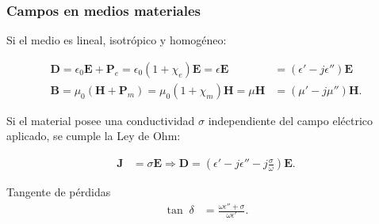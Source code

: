 \documentclass{beamer}
\renewcommand{\vec}[1]{\boldsymbol{#1}}
\begin{document}
		\begin{frame}
		\frametitle{Campos en medios materiales}
		Si el medio es lineal, isotrópico y homogéneo: %
		
		\begin{align*}
		\vec{D} = \epsilon_0 \vec{E} + \vec{P}_e = \epsilon_0 (1+\chi_e)\vec{E} = \epsilon \vec{E} &= (\epsilon' - j \epsilon'') \vec{E}\\
		\vec{B} = \mu_0 (\vec{H} + \vec{P}_m) = \mu_0 (1+\chi_m)\vec{H} = \mu \vec{H} &= (\mu' - j \mu'') \vec{H}.
		\end{align*}
		
		Si el material posee una conductividad $\sigma$ independiente del campo eléctrico aplicado, se cumple la Ley de Ohm:
		
		\begin{align*}
		\vec{J} &= \sigma \vec{E} \Rightarrow \vec{D} = \left( \epsilon' - j\epsilon'' - j \frac{\sigma}{\omega} \right) \vec{E}.
		\end{align*}
		
		\begin{block}{Tangente de pérdidas}
			\setlength\abovedisplayskip{0pt}
			\begin{align*}
			\tan \; \delta &= \frac{\omega \epsilon'' + \sigma}{\omega \epsilon'}.
			\end{align*}
		\end{block}
		
		
		\end{frame}
		
\end{document}
